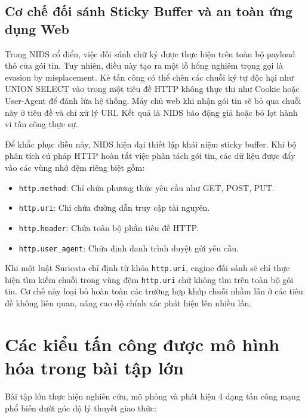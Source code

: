 \subsection{Cơ chế đối sánh Sticky Buffer và an toàn ứng dụng Web}
Trong NIDS cổ điển, việc đối sánh chữ ký được thực hiện trên toàn bộ payload thô của gói tin. Tuy nhiên, điều này tạo ra một lỗ hổng nghiêm trọng gọi là evasion by misplacement. Kẻ tấn công có thể chèn các chuỗi ký tự độc hại như UNION SELECT vào trong một tiêu đề HTTP không thực thi như Cookie hoặc User-Agent để đánh lừa hệ thống. Máy chủ web khi nhận gói tin sẽ bỏ qua chuỗi này ở tiêu đề và chỉ xử lý URI. Kết quả là NIDS báo động giả hoặc bỏ lọt hành vi tấn công thực sự.

Để khắc phục điều này, NIDS hiện đại thiết lập khái niệm sticky buffer. Khi bộ phân tích cú pháp HTTP hoàn tất việc phân tách gói tin, các dữ liệu được đẩy vào các vùng nhớ đệm riêng biệt gồm:
\begin{itemize}
    \item \texttt{http.method}: Chỉ chứa phương thức yêu cầu như GET, POST, PUT.
    \item \texttt{http.uri}: Chỉ chứa đường dẫn truy cập tài nguyên.
    \item \texttt{http.header}: Chứa toàn bộ phần tiêu đề HTTP.
    \item \texttt{http.user\_agent}: Chứa định danh trình duyệt gửi yêu cầu.
\end{itemize}
Khi một luật Suricata chỉ định từ khóa \texttt{http.uri}, engine đối sánh sẽ chỉ thực hiện tìm kiếm chuỗi trong vùng đệm \texttt{http.uri} chứ không tìm trên toàn bộ gói tin. Cơ chế này loại bỏ hoàn toàn các trường hợp khớp chuỗi nhầm lẫn ở các tiêu đề không liên quan, nâng cao độ chính xác phát hiện lên nhiều lần.

\section{Các kiểu tấn công được mô hình hóa trong bài tập lớn}
Bài tập lớn thực hiện nghiên cứu, mô phỏng và phát hiện 4 dạng tấn công mạng phổ biến dưới góc độ lý thuyết giao thức:

